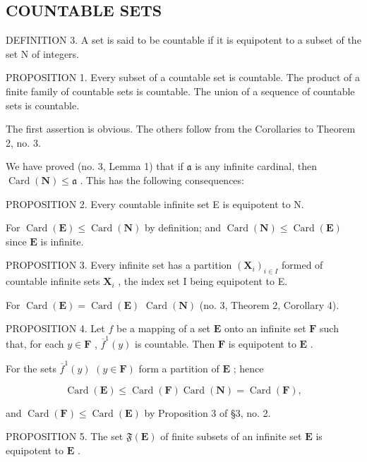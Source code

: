 \subsection{COUNTABLE SETS}

DEFINITION 3. A set is said to be countable if it is equipotent to a subset of the set N of integers.

PROPOSITION 1. Every subset of a countable set is countable. The product of a finite family of countable sets is countable. The union of a sequence of countable sets is countable.

The first assertion is obvious. The others follow from the Corollaries to Theorem 2, no. 3.

We have proved (no. 3, Lemma 1) that if \(\mathfrak{a}\) is any infinite cardinal, then \(\operatorname{Card}(\mathbf{N}) \leqslant \mathfrak{a}\) . This has the following consequences:

PROPOSITION 2. Every countable infinite set E is equipotent to N.

For \(\operatorname{Card}(\mathbf{E}) \leqslant \operatorname{Card}(\mathbf{N})\) by definition; and \(\operatorname{Card}(\mathbf{N}) \leqslant \operatorname{Card}(\mathbf{E})\) since \(\mathbf{E}\) is infinite.

PROPOSITION 3. Every infinite set has a partition \((\mathbf{X}_i)_{i\in I}\) formed of countable infinite sets \(\mathbf{X}_i\) , the index set I being equipotent to E.

For \(\operatorname{Card}(\mathbf{E}) = \operatorname{Card}(\mathbf{E})\) \(\operatorname{Card}(\mathbf{N})\) (no. 3, Theorem 2, Corollary 4).

PROPOSITION 4. Let \(f\) be a mapping of a set \(\mathbf{E}\) onto an infinite set \(\mathbf{F}\) such that, for each \(y \in \mathbf{F}\) , \(\overline{f}^1(y)\) is countable. Then \(\mathbf{F}\) is equipotent to \(\mathbf{E}\) .

For the sets \(\overline{f}^1 (y)\) \((y\in \mathbf{F})\) form a partition of \(\mathbf{E}\) ; hence

\[
\operatorname{Card} (\mathbf {E}) \leqslant \operatorname{Card} (\mathbf {F}) \operatorname{Card} (\mathbf {N}) = \operatorname{Card} (\mathbf {F}),
\]

and \(\operatorname{Card}(\mathbf{F}) \leqslant \operatorname{Card}(\mathbf{E})\) by Proposition 3 of §3, no. 2.

PROPOSITION 5. The set \(\mathfrak{F}(\mathbf{E})\) of finite subsets of an infinite set \(\mathbf{E}\) is equipotent to \(\mathbf{E}\) .

